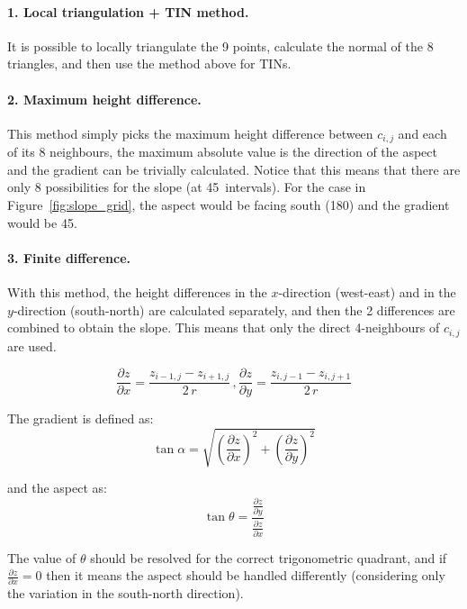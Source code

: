 \paragraph{1. Local triangulation + TIN method.}
It is possible to locally triangulate the 9 points, calculate the normal of the 8 triangles, and then use the method above for TINs.


\paragraph{2. Maximum height difference.}
This method simply picks the maximum height difference between $c_{i,j}$ and each of its 8 neighbours, the maximum absolute value is the direction of the aspect and the gradient can be trivially calculated.
Notice that this means that there are only 8 possibilities for the slope (at 45\degree\ intervals).
For the case in Figure~\ref{fig:slope_grid}, the aspect would be facing south (180\degree) and the gradient would be 45\degree.


\paragraph{3. Finite difference.}

With this method, the height differences in the $x$-direction (west-east) and in the $y$-direction (south-north) are calculated separately, and then the 2 differences are combined to obtain the slope.
This means that only the direct 4-neighbours of $c_{i,j}$ are used.

\begin{equation}
  \frac{\partial z}{\partial x} = \frac{z_{i-1,j} - z_{i+1,j}}{2\,r}
\, , 
  \frac{\partial z}{\partial y} = \frac{z_{i,j-1} - z_{i,j+1}}{2\,r}
\end{equation}

The gradient is defined as:
\begin{equation}
  \tan \alpha = \sqrt{(\frac{\partial z}{\partial x})^2 + (\frac{\partial z}{\partial y})^2}
\end{equation}

and the aspect as:
\begin{equation}
  \tan \theta = \frac{\frac{\partial z}{\partial y}}{\frac{\partial z}{\partial x}}
\end{equation}

The value of $\theta$ should be resolved for the correct trigonometric quadrant, and if $\frac{\partial z}{\partial x} = 0$ then it means the aspect should be handled differently (considering only the variation in the south-north direction). 


